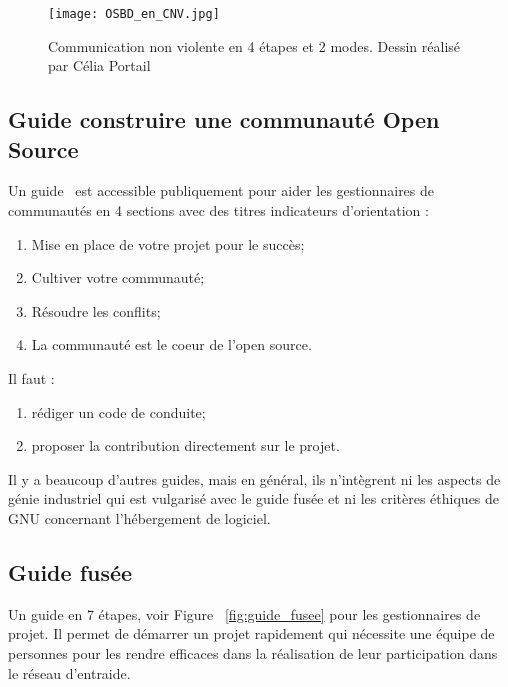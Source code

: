 \begin{figure}[htb]
\centering
\texttt{[image: OSBD\_en\_CNV.jpg]}
\caption{Communication non violente en 4 étapes et 2 modes. Dessin réalisé par Célia Portail~\cite{wikipedia_image_non_violente}}
\label{fig:communication_non_violente}
\end{figure}

\subsection{Guide construire une communauté Open Source}

Un guide~\cite{url_open_source_guide} est accessible publiquement pour aider les gestionnaires de communautés en 4 sections avec des titres indicateurs d’orientation :

\begin{enumerate}
    \item Mise en place de votre projet pour le succès;
    \item Cultiver votre communauté;
    \item Résoudre les conflits;
    \item La communauté est le coeur de l’open source.
\end{enumerate}

Il faut :
\begin{enumerate}
    \item rédiger un code de conduite;
    \item proposer la contribution directement sur le projet.
\end{enumerate}

Il y a beaucoup d'autres guides, mais en général, ils n'intègrent ni les aspects de génie industriel qui est vulgarisé avec le guide fusée et ni les critères éthiques de GNU concernant l’hébergement de logiciel.

\subsection{Guide fusée}

Un guide en 7 étapes, voir Figure ~\ref{fig:guide_fusee} pour les gestionnaires de projet. Il permet de démarrer un projet rapidement qui nécessite une équipe de personnes pour les rendre efficaces dans la réalisation de leur participation dans le réseau d’entraide.

